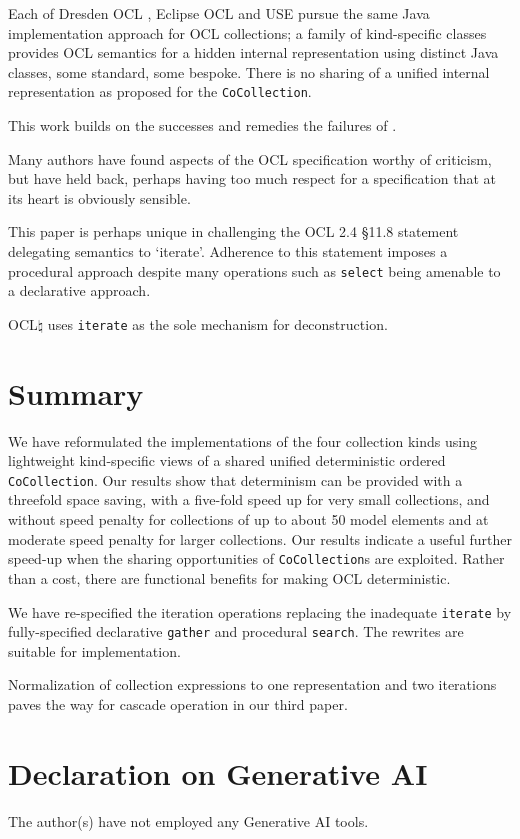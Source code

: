 \documentclass[
]{ceurart}
\begin{document}
Each of Dresden OCL \cite{Dresden-OCL}, Eclipse OCL \cite{Eclipse-OCL} and USE \cite{USE} pursue the same Java implementation approach for OCL collections; a family of kind-specific classes provides OCL semantics for a hidden internal representation using distinct Java classes, some standard, some bespoke. There is no sharing of a unified internal representation as proposed for the \verb!CoCollection!.

This work builds on the successes and remedies the failures of \cite{willink2017deterministic}.

Many authors \cite{wilke2011uml} have found aspects of the OCL specification worthy of criticism, but have held back, perhaps having too much respect for a specification that at its heart is obviously sensible.

This paper is perhaps unique in challenging the OCL 2.4 \S11.8 statement delegating semantics to `iterate'. Adherence to this statement imposes a procedural approach despite many operations such as \verb!select! being amenable to a declarative approach.  

OCL$\natural$ \cite{steimann2023ocl} uses \verb!iterate! as the sole mechanism for deconstruction.

\section{Summary}\label{Summary}

We have reformulated the implementations of the four collection kinds using lightweight kind-specific views of a shared unified deterministic ordered \verb!CoCollection!. Our results show that determinism can be provided with a threefold space saving, with a five-fold speed up for very small collections, and without speed penalty for collections of up to about 50 model elements and at moderate speed penalty for larger collections. Our results indicate a useful further speed-up when the sharing opportunities of \verb!CoCollection!s are exploited. Rather than a cost, there are functional benefits for making OCL deterministic. 

We have re-specified the iteration operations replacing the inadequate \verb!iterate! by fully-specified declarative \verb!gather! and procedural \verb!search!. The rewrites are suitable for implementation.

Normalization of collection expressions to one representation and two iterations paves the way for cascade operation in our third paper. 
\section*{Declaration on Generative AI}
  The author(s) have not employed any Generative AI tools.



\end{document}
